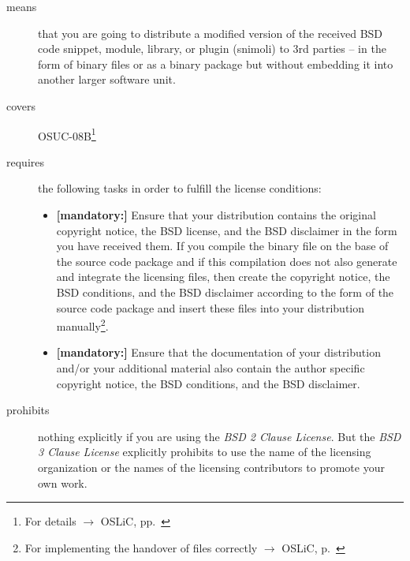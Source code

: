 \begin{description}
\item[means] that you are going to distribute a modified version of the received
BSD code snippet, module, library, or plugin (snimoli) to 3rd parties -- in the
form of binary files or as a binary package but without embedding it into
another larger software unit.
\item[covers] OSUC-08B\footnote{For details $\rightarrow$ OSLiC, pp.\
\pageref{OSUC-08B-DEF}}
\item[requires] the following tasks in order to fulfill the license conditions:
\begin{itemize}
   \item  \textbf{[mandatory:]} Ensure that your distribution contains the
  original copyright notice, the BSD license, and the BSD disclaimer in the form
  you have received them. If you compile the binary file on the base of the
  source code package and if this compilation does not also generate and
  integrate the licensing files, then create the copyright notice, the BSD
  conditions, and the BSD disclaimer according to the form of the source code
  package and insert these files into your distribution manually\footnote{For
  implementing the handover of files correctly $\rightarrow$ OSLiC, p.\ 
  \pageref{DistributingFilesHint}}.
  \item  \textbf{[mandatory:]} Ensure that the documentation of your
  distribution and/or your additional material also contain the author specific
  copyright notice, the BSD conditions, and the BSD disclaimer.
\end{itemize}

\item[prohibits] nothing explicitly if you are using the \emph{BSD 2 Clause
License}. But the \emph{BSD 3 Clause License} explicitly prohibits to use the
name of the licensing organization or the names of the licensing contributors to
promote your own work.

\end{description}

